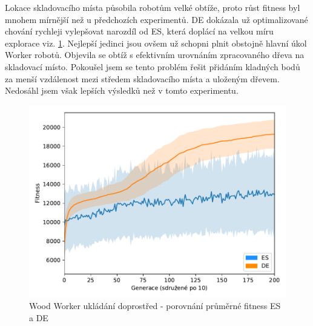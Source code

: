    	Lokace skladovacího místa působila robotům velké obtíže, proto růst fitness byl mnohem mírnější než u předchozích experimentů. DE dokázala už optimalizované chování rychleji vylepšovat narozdíl od ES, která doplácí na velkou míru explorace viz. \ref{obr04:StockESvsDE}. Nejlepší jedinci jsou ovšem už schopni plnit obstojně hlavní úkol Worker robotů. Objevila se obtíž s efektivním urovnáním zpracovaného dřeva na skladovací místo. Pokoušel jsem se tento problém řešit přidáním kladných bodů za menší vzdálenost mezi středem skladovacího místa a uloženým dřevem. Nedosáhl jsem však lepších výsledků než v tomto experimentu. 
   	\newpage
	\begin{figure}[h]\centering
		\includegraphics[width=\columnwidth]{../img/WoodMap/DEvsES/WorkerStockMem}
		\caption{Wood Worker ukládání doprostřed  - porovnání průměrné fitness ES a DE}
		\label{obr04:StockESvsDE}
	\end{figure}
